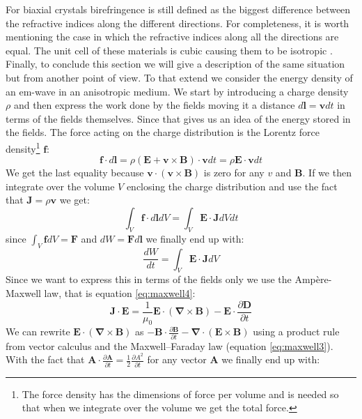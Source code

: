 For biaxial crystals birefringence is still defined as the biggest difference between the refractive indices along the different directions. For completeness, it is worth mentioning the case in which the refractive indices along all the directions are equal. The unit cell of these materials is cubic causing them to be isotropic \cite{Hecht}. 
Finally, to conclude this section we will give a description of the same situation but from another point of view. To that extend we consider the energy density of an em-wave in an anisotropic medium.
We start by introducing a charge density $\rho$ and then express the work done by the fields moving it a distance $d\bm{l}=\bm{v}dt$ in terms of the fields themselves. Since that gives us an idea of the energy stored in the fields. The force acting on the charge distribution is the Lorentz force density\footnote{The force density has the dimensions of force per volume and is needed so that when we integrate over the volume we get the total force.} $\bm{f}$:
\begin{equation}
    \bm{f}\cdot d\bm{l}=\rho(\bm{E}+\bm{v}\times\bm{B})\cdot\bm{v}dt=\rho\bm{E}\cdot\bm{v}dt
\end{equation}
We get the last equality because $\bm{v}\cdot(\bm{v}\times\bm{B})$ is zero for any $v$ and $\bm{B}$. 
If we then integrate over the volume $V$ enclosing the charge distribution and use the fact that $\bm{J}=\rho\bm{v}$ we get:
\begin{equation}
    \int_V \bm{f}\cdot d\bm{l} dV =\int_V \bm{E}\cdot\bm{J} dVdt
\end{equation}
since $\int_V \bm{f} dV = \bm{F}$ and $dW = \bm{F} d\bm{l}$ we finally end up with:
\begin{equation}
    \label{eq:emf_work}
    \frac{dW}{dt} = \int_V \bm{E}\cdot\bm{J} dV
\end{equation}
Since we want to express this in terms of the fields only we use the Ampère-Maxwell law, that is equation \ref{eq:maxwell4}:
\begin{equation}
    \bm{J}\cdot\bm{E} = \frac{1}{\mu_0}\bm{E}\cdot(\bm{\nabla}\times\bm{B})-\bm{E}\cdot\frac{\partial\bm{D}}{\partial t}
\end{equation}
We can rewrite $\bm{E}\cdot(\bm{\nabla}\times\bm{B})$ as $-\bm{B}\cdot\frac{\partial \bm{B}}{\partial t} - \bm{\nabla}\cdot(\bm{E}\times\bm{B})$ using a product rule from vector calculus and the Maxwell–Faraday law (equation \ref{eq:maxwell3}). With the fact that $\bm{A}\cdot\frac{\partial \bm{A}}{\partial t} = \frac{1}{2} \frac{\partial A^2}{\partial t}$ for any vector $\bm{A}$ we finally end up with:
